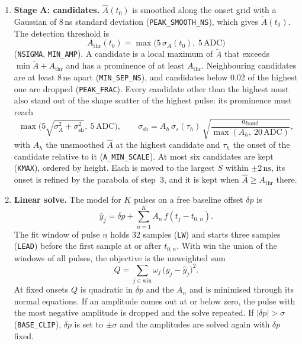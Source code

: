 \documentclass[11pt]{article}
\newcommand{\ns}{\,\mathrm{ns}}
\newcommand{\adc}{\,\mathrm{ADC}}
\newcommand{\code}[1]{\texttt{#1}}
\begin{document}
\begin{enumerate}
\item \textbf{Stage A: candidates.} $\hat A(t_0)$ is smoothed along the onset grid with a Gaussian of 8\,ns standard deviation (\code{PEAK\_SMOOTH\_NS}), which gives $\tilde A(t_0)$. The detection threshold is
\begin{equation}
A_{\mathrm{thr}}(t_0) = \max\big(5\,\sigma_A(t_0),\ 5\adc\big)
\label{eq:athr}
\end{equation}
(\code{NSIGMA}, \code{MIN\_AMP}). A candidate is a local maximum of $\tilde A$ that exceeds $\min \tilde A + A_{\mathrm{thr}}$ and has a prominence of at least $A_{\mathrm{thr}}$. Neighbouring candidates are at least 8\,ns apart (\code{MIN\_SEP\_NS}), and candidates below 0.02 of the highest one are dropped (\code{PEAK\_FRAC}). Every candidate other than the highest must also stand out of the shape scatter of the highest pulse: its prominence must reach
\begin{equation}
\max\Big(5\sqrt{\sigma_A^2 + \sigma_{\mathrm{sh}}^2},\ 5\adc\Big),
\qquad
\sigma_{\mathrm{sh}} = A_h\, \sigma_s(\tau_h)\, \sqrt{\frac{a_{\mathrm{band}}}{\max(A_h,\ 20\adc)}} ,
\label{eq:sigsh}
\end{equation}
with $A_h$ the unsmoothed $\hat A$ at the highest candidate and $\tau_h$ the onset of the candidate relative to it (\code{A\_MIN\_SCALE}). At most six candidates are kept (\code{KMAX}), ordered by height. Each is moved to the largest $S$ within $\pm 2\ns$, its onset is refined by the parabola of step~3, and it is kept when $\hat A \ge A_{\mathrm{thr}}$ there.
\item \textbf{Linear solve.} The model for $K$ pulses on a free baseline offset $\delta p$ is
\begin{equation}
\hat y_j = \delta p + \sum_{n=1}^{K} A_n\, f(t_j - t_{0,n}) .
\label{eq:model}
\end{equation}
The fit window of pulse $n$ holds 32 samples (\code{LW}) and starts three samples (\code{LEAD}) before the first sample at or after $t_{0,n}$. With $\mathrm{win}$ the union of the windows of all pulses, the objective is the unweighted sum
\begin{equation}
Q = \sum_{j \in \mathrm{win}} \omega_j\, \big(y_j - \hat y_j\big)^2 .
\label{eq:obj}
\end{equation}
At fixed onsets $Q$ is quadratic in $\delta p$ and the $A_n$ and is minimised through its normal equations. If an amplitude comes out at or below zero, the pulse with the most negative amplitude is dropped and the solve repeated. If $|\delta p| > \sigma$ (\code{BASE\_CLIP}), $\delta p$ is set to $\pm\sigma$ and the amplitudes are solved again with $\delta p$ fixed.

\end{enumerate}
\end{document}
